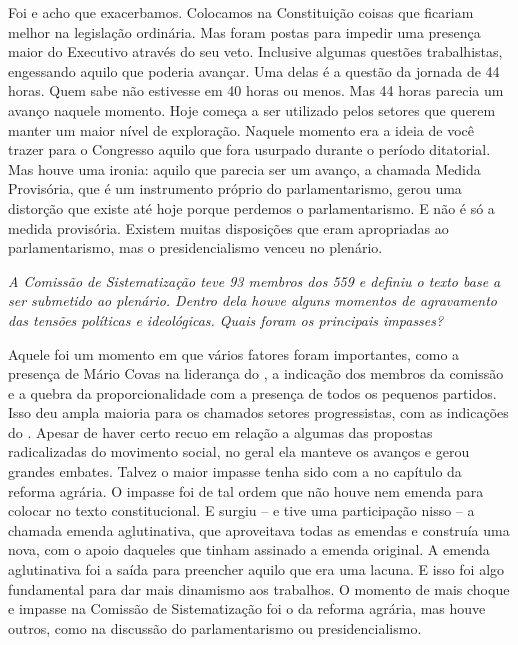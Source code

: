 Foi e acho que exacerbamos. Colocamos na Constituição
coisas que ficariam melhor na legislação ordinária. Mas foram postas
para impedir uma presença maior do Executivo através do seu veto.
Inclusive algumas questões trabalhistas, engessando aquilo que poderia
avançar. Uma delas é a questão da jornada de 44 horas. Quem sabe não
estivesse em 40 horas ou menos. Mas 44 horas parecia um avanço naquele
momento. Hoje começa a ser utilizado pelos setores que querem manter um
maior nível de exploração. Naquele momento era a ideia de você trazer
para o Congresso aquilo que fora usurpado durante o período ditatorial.
Mas houve uma ironia: aquilo que parecia ser um avanço, a chamada
Medida Provisória, que é um instrumento próprio do parlamentarismo,
gerou uma distorção que existe até hoje porque perdemos o
parlamentarismo. E não é só a medida provisória. Existem muitas
disposições que eram apropriadas ao parlamentarismo, mas o
presidencialismo venceu no plenário.

\medskip

\noindent\emph{A Comissão de Sistematização teve 93 membros dos 559 e definiu o
texto base a ser submetido ao plenário. Dentro dela houve alguns
momentos de agravamento das tensões políticas e ideológicas. Quais foram
os principais impasses?}

Aquele foi um momento em que vários fatores foram
importantes, como a presença de Mário Covas na liderança do , a
indicação dos membros da comissão e a quebra da proporcionalidade com a
presença de todos os pequenos partidos. Isso deu ampla maioria para os
chamados setores progressistas, com as indicações do . Apesar de haver
certo recuo em relação a algumas das propostas radicalizadas do
movimento social, no geral ela manteve os avanços e gerou grandes
embates. Talvez o maior impasse tenha sido com a  no capítulo da
reforma agrária. O impasse foi de tal ordem que não houve nem emenda
para colocar no texto constitucional. E surgiu -- e tive uma
participação nisso -- a chamada emenda aglutinativa, que aproveitava
todas as emendas e construía uma nova, com o apoio daqueles que tinham
assinado a emenda original. A emenda aglutinativa foi a saída para
preencher aquilo que era uma lacuna. E isso foi algo fundamental para
dar mais dinamismo aos trabalhos. O momento de mais choque e impasse
na Comissão de Sistematização foi o da reforma agrária, mas houve
outros, como na discussão do parlamentarismo ou presidencialismo.

\medskip

